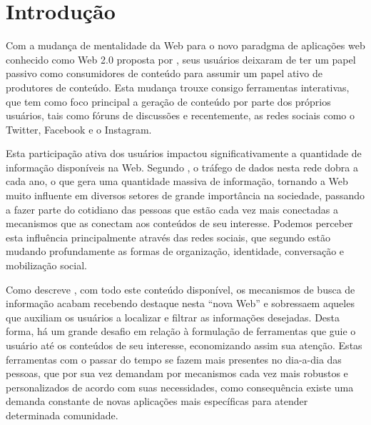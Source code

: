 \section{\esp Introdução}
Com a mudança de mentalidade da Web para o novo paradgma de aplicações web conhecido como Web 2.0 proposta por \cite{web20Proposta}, seus 
usuários deixaram de ter um papel passivo como consumidores de conteúdo para assumir um papel ativo de produtores de conteúdo. Esta mudança 
trouxe consigo ferramentas interativas, que tem como foco principal a geração de conteúdo por parte dos próprios usuários, tais como fóruns 
de discussões e recentemente, as redes sociais como o Twitter, Facebook e o Instagram.

Esta participação ativa dos usuários impactou significativamente a quantidade de informação disponíveis na Web. Segundo \cite{artigo01}, 
o tráfego de dados nesta rede dobra a cada ano, o que gera uma quantidade massiva de informação, tornando a Web muito influente em diversos 
setores de grande importância na sociedade, passando a fazer parte do cotidiano das pessoas que estão cada vez mais conectadas a mecanismos que
as  conectam aos conteúdos de seu interesse. Podemos perceber esta influência principalmente através das redes sociais, que segundo 
\cite{redesSociais01} estão mudando profundamente as formas de organização, identidade, conversação e mobilização social.

Como descreve \cite{deitelAjax}, com todo este conteúdo disponível, os mecanismos de busca de informação 
acabam recebendo destaque nesta ``nova Web'' e sobressaem aqueles que auxiliam os usuários  a localizar e filtrar 
as informações desejadas. Desta forma, há um grande desafio em relação à formulação de ferramentas que guie o usuário até os conteúdos de seu 
interesse, economizando assim sua atenção. Estas ferramentas com o passar do tempo se fazem mais presentes no dia-a-dia das pessoas, 
que por sua vez demandam por mecanismos cada vez mais robustos e personalizados de acordo com suas necessidades, como consequência existe 
uma demanda constante de novas aplicações mais específicas para atender determinada comunidade.

